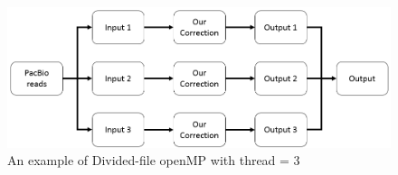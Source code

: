 \begin{figure} [h]
\centering
\includegraphics[scale=0.4]{Figures/chapter3/divided_file_openMP.png}
\caption{An example of Divided-file openMP with thread = 3}
\label{divided_file_openMP}
\end{figure}